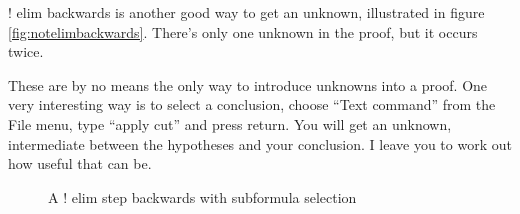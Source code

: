 \documentclass[11pt]{book}
\newcommand{\figref}[1]{figure \ref{fig:#1}}
\begin{document}
$!$ elim backwards is another good way to get an unknown, illustrated in \figref{notelimbackwards}. There's only one unknown in the proof, but it occurs twice.

These are by no means the only way to introduce unknowns into a proof. One very interesting way is to select a conclusion, choose ``Text command'' from the File menu, type ``apply cut'' and press return. You will get an unknown, intermediate between the hypotheses and your conclusion. I leave you to work out how useful that can be.

\begin{figure}
\centering
{}
\qquad
{}
\caption{A $!$ elim step backwards with subformula selection}
\label{fig:notelimbackwardswithsubformula}
\end{figure}
\end{document}
